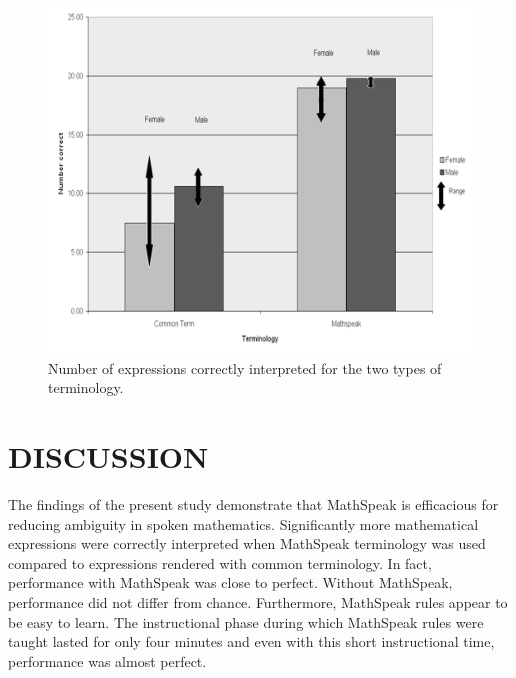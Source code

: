 \documentclass[11.5pt]{sig-alternate} %
\begin{document}
\begin{large}
\begin{figure}[h!]
    \centering
    \includegraphics[width=1\textwidth]{images/fig1.png}
    \caption{Number of expressions correctly interpreted for the two types of terminology.}
    \label{Figure 1}
\end{figure}

\section*{DISCUSSION}
The findings of the present study demonstrate that MathSpeak is efficacious for reducing ambiguity in spoken mathematics. Significantly more mathematical expressions were correctly interpreted when MathSpeak terminology was used compared to expressions rendered with common terminology. In fact, performance with MathSpeak was close to perfect. Without MathSpeak, performance did not differ from chance. Furthermore, MathSpeak rules appear to be easy to learn. The instructional phase during which MathSpeak rules were taught lasted for only four minutes and even with this short instructional time, performance was almost perfect.


\end{large}
\end{document}
